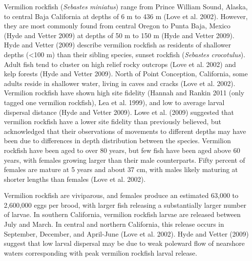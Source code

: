 \documentclass[11pt,
  english,
]{article}
\begin{document}
Vermilion rockfish (\emph{Sebastes miniatus}) range from Prince William Sound, Alaska, to central Baja California at depths of 6 m to 436 m {(Love et al. 2002)\leavevmode\tagmcend\tagstructend}. However, they are most commonly found from central Oregon to Punta Baja, Mexico {(Hyde and Vetter 2009)\leavevmode\tagmcend\tagstructend} at depths of 50 m to 150 m {(Hyde and Vetter 2009)\leavevmode\tagmcend\tagstructend}. Hyde and Vetter {(2009)\leavevmode\tagmcend\tagstructend} describe vermilion rockfish as residents of shallower depths (\textless100 m) than their sibling species, sunset rockfish (\emph{Sebastes crocotulus}). Adult fish tend to cluster on high relief rocky outcrops {(Love et al. 2002)\leavevmode\tagmcend\tagstructend} and kelp forests {(Hyde and Vetter 2009)\leavevmode\tagmcend\tagstructend}. North of Point Conception, California, some adults reside in shallower water, living in caves and cracks {(Love et al. 2002)\leavevmode\tagmcend\tagstructend}. Vermilion rockfish have shown high site fidelity {(Hannah and Rankin 2011 (only tagged one vermilion rockfish), Lea et al. 1999)\leavevmode\tagmcend\tagstructend}, and low to average larval dispersal distance {(Hyde and Vetter 2009)\leavevmode\tagmcend\tagstructend}. Lowe et al. {(2009)\leavevmode\tagmcend\tagstructend} suggested that vermilion rockfish have a lower site fidelity than previously believed, but acknowledged that their observations of movements to different depths may have been due to differences in depth distribution between the species. Vermilion rockfish have been aged to over 80 years, but few fish have been aged above 60 years, with females growing larger than their male counterparts. Fifty percent of females are mature at 5 years and about 37 cm, with males likely maturing at shorter lengths than females {(Love et al. 2002)\leavevmode\tagmcend\tagstructend}.

Vermilion rockfish are viviparous, and females produce an estimated 63,000 to 2,600,000 eggs per brood, with larger fish releasing a substantially larger number of larvae. In southern California, vermilion rockfish larvae are released between July and March. In central and northern California, this release occurs in September, December, and April-June {(Love et al. 2002)\leavevmode\tagmcend\tagstructend}. Hyde and Vetter {(2009)\leavevmode\tagmcend\tagstructend} suggest that low larval dispersal may be due to weak poleward flow of nearshore waters corresponding with peak vermilion rockfish larval release.
\end{document}

